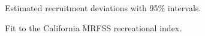 \documentclass[
]{scrartcl}
\begin{document}
\begin{figure}


\caption{\label{fig-recdevs_err}Estimated recruitment deviations with
95\% intervals.}

\end{figure}%

\clearpage

\begin{figure}


\caption{\label{fig-indexfit3}Fit to the California MRFSS recreational
index.}

\end{figure}%
\end{document}
